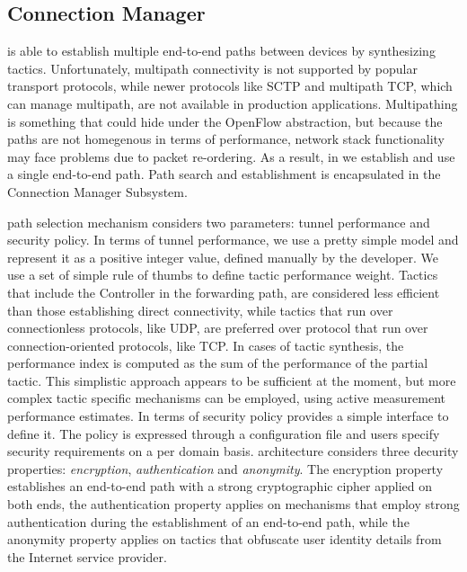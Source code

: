 \subsection{Connection Manager} \label{signpost-engine}

\signpost is able to establish multiple end-to-end paths between devices by
synthesizing tactics. Unfortunately, multipath connectivity is not supported by
popular transport protocols, while newer protocols like SCTP and multipath TCP,
which can manage multipath, are not available in production applications.
Multipathing is something that \signpost could hide under the OpenFlow
abstraction, but because the paths are not homegenous in terms of performance,
network stack functionality may face problems due to packet re-ordering.  As a
result, in \signpost we establish and use a single end-to-end path.  Path search
and establishment is encapsulated in the Connection Manager Subsystem. 

\signpost path selection mechanism considers two parameters: tunnel performance
and security policy. In terms of tunnel performance, we use a pretty simple
model and represent it as a positive integer value, defined manually by the
developer. We use a set of simple rule of thumbs to define tactic performance
weight. Tactics that include the Controller in the forwarding path, are
considered less efficient than those establishing direct connectivity, while
tactics that run over connectionless protocols, like UDP, are preferred over
protocol that run over connection-oriented protocols, like TCP.  In cases of
tactic synthesis, the performance index is computed as the sum of the
performance of the partial tactic. This simplistic approach appears to be
sufficient at the moment, but more complex tactic specific mechanisms can be
employed, using active measurement performance estimates. In terms of security
policy \signpost provides a simple interface to define it. The policy is
expressed through a configuration file and users specify security requirements
on a per domain basis. \signpost architecture considers three decurity
properties: \textit{encryption}, \textit{authentication} and \textit{anonymity}.
The encryption property establishes an end-to-end path with a strong
cryptographic cipher applied on both ends, the authentication property applies
on mechanisms that employ strong authentication during the establishment of an
end-to-end path, while the anonymity property applies on tactics that obfuscate
user identity details from the Internet service provider. 

